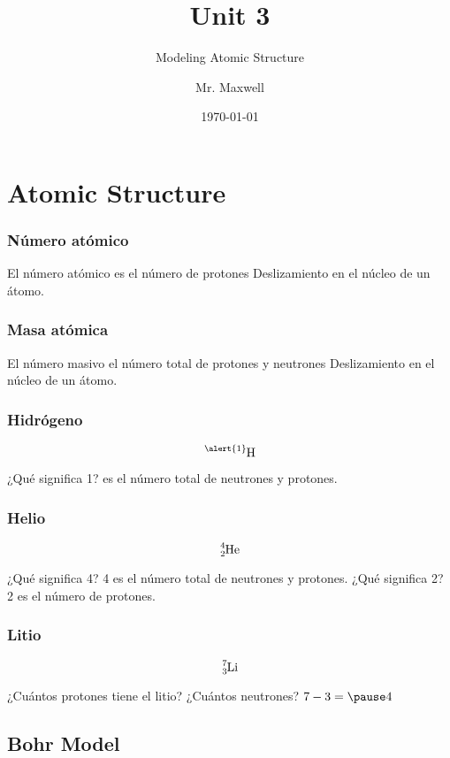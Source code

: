 \documentclass{beamer}
\title{Unit 3}
\subtitle{Modeling Atomic Structure}
\author{Mr. Maxwell}
\institute{PACS}
\date{\today}
\begin{document}
\frame{\titlepage}

\section{Atomic Structure}

\begin{frame}

    \frametitle{Número atómico}
    \onslide El 
     \pause \alert{número atómico}
     \onslide es el número de 
     \pause \alert{protones} 
     Deslizamiento en el núcleo de un átomo.
\end{frame}


\begin{frame}

    \frametitle{Masa atómica}
    \onslide El 
     \pause \alert{número masivo}
     \onslide el número total de
     \pause \alert{protones} 
     \onslide y
     \pause \alert{neutrones} 
     Deslizamiento en el núcleo de un átomo.

    \end{frame}

\begin{frame}

    \frametitle{Hidrógeno}
    $$\ce{^{\alert{1}}_{}H}$$

    \pause ¿Qué significa \alert{1}?
     es el número total de neutrones y protones.
\end{frame}


\begin{frame}

    \frametitle{Helio}
 $$\ce{^{4}_{2}He}$$

 \pause ¿Qué significa \alert{4}?
 \pause \alert{4} es el número total de neutrones y protones.
 \pause ¿Qué significa \alert{2}?
 \pause \alert{2} es el número de protones.

\end{frame}

\begin{frame}

    \frametitle{Litio}
 $$\ce{^{7}_{3}Li}$$

 \pause ¿Cuántos protones tiene el litio?
 \pause ¿Cuántos neutrones?
 \pause $7 - 3 = \pause 4 $
\end{frame}

\subsection{Bohr Model}
\end{document}
